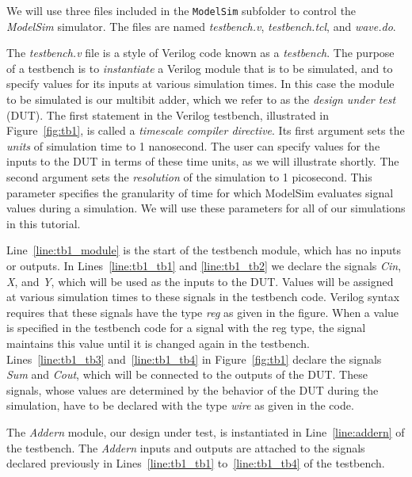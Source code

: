 \documentclass[11pt, twoside, pdftex]{article}
\begin{document}
\noindent
We will use three files included in the \texttt{ModelSim} subfolder to control the 
{\it ModelSim} simulator. The files are named {\it testbench.v}, {\it testbench.tcl}, and 
{\it wave.do}.

\noindent
The {\it testbench.v} file is a style of Verilog code known as a {\it testbench}. 
The purpose of a testbench is to {\it instantiate} a Verilog module that is to be simulated,
and to specify values for its inputs at various simulation times. In this case the module
to be simulated is our multibit adder, which we refer to as the {\it design under test} (DUT).
The first statement in the Verilog 
testbench, illustrated in Figure~\ref{fig:tb1}, is called a {\it timescale compiler directive}.
Its first argument sets the {\it units} of simulation time to 1 nanosecond. The user can
specify values for the inputs to the DUT in terms of these time units, as we will illustrate
shortly. The second argument sets the {\it resolution} of the simulation to 1 picosecond.
This parameter specifies the granularity of time for which ModelSim evaluates signal values
during a simulation. We will use these parameters for all of our simulations in this tutorial.

\noindent
Line~\ref{line:tb1_module} is the start of the testbench module, which has no inputs or
outputs. In Lines~\ref{line:tb1_tb1} and \ref{line:tb1_tb2} we declare the signals {\it Cin}, 
{\it X}, and {\it Y}, which will be used as the inputs to the DUT. Values will be assigned 
at various simulation times to these signals in the testbench code. Verilog syntax requires
that these signals have the type {\it reg} as given in the figure.  When a value is 
specified in the testbench code for a signal with the reg type, the signal maintains this 
value until it is changed again in the testbench.  Lines~\ref{line:tb1_tb3} 
and~\ref{line:tb1_tb4} in Figure~\ref{fig:tb1} declare the signals {\it Sum} and
{\it Cout}, which will be connected to the outputs of the DUT. These signals, 
whose values are determined by the behavior of the DUT during the simulation, have to be 
declared with the type {\it wire} as given in the code.

\noindent
The {\it Addern} module, our design under test, is instantiated in Line~\ref{line:addern} of the 
testbench. The {\it Addern} inputs and outputs are attached to the signals declared previously
in Lines~\ref{line:tb1_tb1} to~\ref{line:tb1_tb4} of the testbench.
\end{document}
